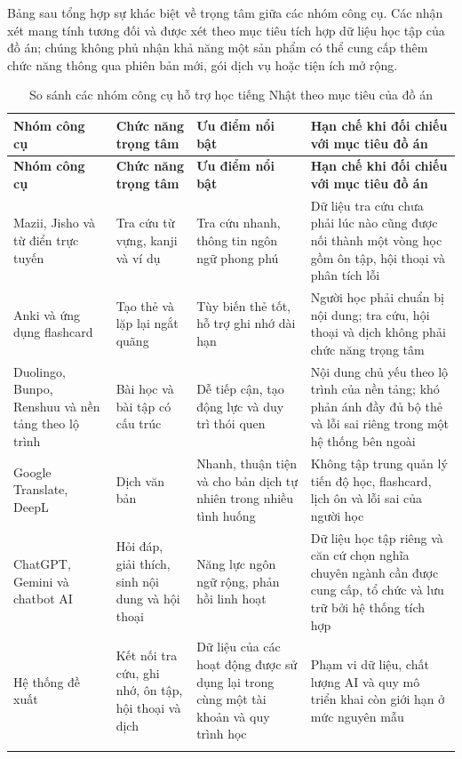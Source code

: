 \documentclass[../DoAn.tex]{subfiles}
\begin{document}
Bảng sau tổng hợp sự khác biệt về trọng tâm giữa các nhóm công cụ. Các nhận xét mang tính tương đối và được xét theo mục tiêu tích hợp dữ liệu học tập của đồ án; chúng không phủ nhận khả năng một sản phẩm có thể cung cấp thêm chức năng thông qua phiên bản mới, gói dịch vụ hoặc tiện ích mở rộng.

{\footnotesize\singlespacing
\begin{longtable}{|p{2.5cm}|p{3cm}|p{3cm}|p{4.5cm}|}
\hline
\textbf{Nhóm công cụ} & \textbf{Chức năng trọng tâm} & \textbf{Ưu điểm nổi bật} & \textbf{Hạn chế khi đối chiếu với mục tiêu đồ án} \\
\hline
\endfirsthead
\hline
\textbf{Nhóm công cụ} & \textbf{Chức năng trọng tâm} & \textbf{Ưu điểm nổi bật} & \textbf{Hạn chế khi đối chiếu với mục tiêu đồ án} \\
\hline
\endhead
Mazii, Jisho và từ điển trực tuyến & Tra cứu từ vựng, kanji và ví dụ & Tra cứu nhanh, thông tin ngôn ngữ phong phú & Dữ liệu tra cứu chưa phải lúc nào cũng được nối thành một vòng học gồm ôn tập, hội thoại và phân tích lỗi \\
\hline
Anki và ứng dụng flashcard & Tạo thẻ và lặp lại ngắt quãng & Tùy biến thẻ tốt, hỗ trợ ghi nhớ dài hạn & Người học phải chuẩn bị nội dung; tra cứu, hội thoại và dịch không phải chức năng trọng tâm \\
\hline
Duolingo, Bunpo, Renshuu và nền tảng theo lộ trình & Bài học và bài tập có cấu trúc & Dễ tiếp cận, tạo động lực và duy trì thói quen & Nội dung chủ yếu theo lộ trình của nền tảng; khó phản ánh đầy đủ bộ thẻ và lỗi sai riêng trong một hệ thống bên ngoài \\
\hline
Google Translate, DeepL & Dịch văn bản & Nhanh, thuận tiện và cho bản dịch tự nhiên trong nhiều tình huống & Không tập trung quản lý tiến độ học, flashcard, lịch ôn và lỗi sai của người học \\
\hline
ChatGPT, Gemini và chatbot AI & Hỏi đáp, giải thích, sinh nội dung và hội thoại & Năng lực ngôn ngữ rộng, phản hồi linh hoạt & Dữ liệu học tập riêng và căn cứ chọn nghĩa chuyên ngành cần được cung cấp, tổ chức và lưu trữ bởi hệ thống tích hợp \\
\hline
Hệ thống đề xuất & Kết nối tra cứu, ghi nhớ, ôn tập, hội thoại và dịch & Dữ liệu của các hoạt động được sử dụng lại trong cùng một tài khoản và quy trình học & Phạm vi dữ liệu, chất lượng AI và quy mô triển khai còn giới hạn ở mức nguyên mẫu \\
\hline
\caption{So sánh các nhóm công cụ hỗ trợ học tiếng Nhật theo mục tiêu của đồ án}
\label{table:2.1}\\
\end{longtable}
}
\end{document}
